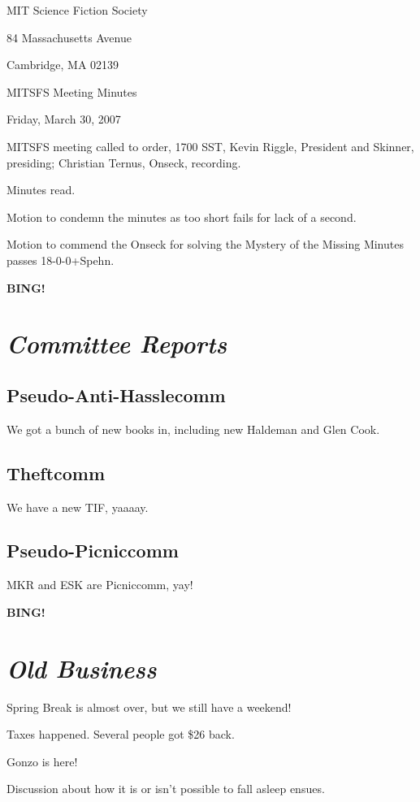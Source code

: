 \documentclass[10pt]{article}
\newcommand{\bing}{{\bf BING!} }
\newcommand{\goto}[1]{\bing \vskip 12pt \section*{{\em{#1}}}}
\begin{document}
\begin{center}

MIT Science Fiction Society

84 Massachusetts Avenue

Cambridge, MA 02139

\vspace{12pt}

MITSFS Meeting Minutes

Friday, March 30, 2007

\end{center}

\vspace{18pt}

\setlength{\parskip}{6pt}

\noindent
MITSFS meeting called to order, 1700 SST,
Kevin Riggle, President and Skinner, presiding; Christian Ternus, Onseck, recording.

Minutes read.

Motion to condemn the minutes as too short fails for lack of a second.

Motion to commend the Onseck for solving the Mystery of the Missing Minutes passes 18-0-0+Spehn.

\goto{Committee Reports}

\subsection*{Pseudo-Anti-Hasslecomm}

We got a bunch of new books in, including new Haldeman and Glen Cook.

\subsection*{Theftcomm}

We have a new TIF, yaaaay.

\subsection*{Pseudo-Picniccomm}

MKR and ESK are Picniccomm, yay!

\goto{Old Business}

Spring Break is almost over, but we still have a weekend!

Taxes happened.  Several people got \$26 back.

Gonzo is here!

Discussion about how it is or isn't possible to fall asleep ensues.
\end{document}
